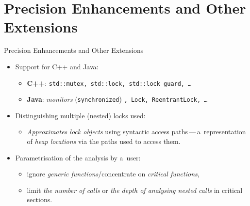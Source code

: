 \documentclass[%
    10pt, xcolor=pdflatex, hyperref={unicode}, aspectratio=169%
]{beamer}
\begin{document}
\section{Precision Enhancements and Other Extensions}
\begin{frame}{Precision Enhancements and Other Extensions}
    \begin{itemize}\setlength\itemsep{2.5em}
        \item
            Support for \alert{C++ and Java}:
            \smallskip
            \begin{itemize}\setlength\itemsep{1em}
                \item
                    \textbf{C++}: \texttt{std::mutex, std::lock,
                    std::lock\_guard, \ldots}

                \item
                    \textbf{Java}: \emph{monitors} (\texttt{synchronized})%
                    \texttt{, Lock, ReentrantLock, \ldots}
            \end{itemize}

        \item
            Distinguishing \alert{multiple (nested) locks} used:
            \smallskip
            \begin{itemize}\setlength\itemsep{1em}
                \item
                    \emph{Approximates lock objects} using \alert{syntactic
                    access paths}\,---\,a~representation of \emph{heap
                    locations} via the paths used to access them.
            \end{itemize}
            
        \item
            \alert{Parametrisation} of the analysis by a~user:
            \smallskip
            \begin{itemize}\setlength\itemsep{1em}
                \item
                    ignore \emph{generic functions}/concentrate on
                    \emph{critical functions},
                    
                \item
                    limit \emph{the number of calls} or \emph{the depth of
                    analysing nested calls} in \alert{critical sections}.
            \end{itemize}
    \end{itemize}
\end{frame}
\end{document}
